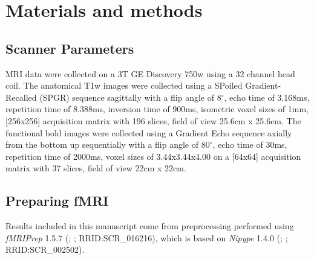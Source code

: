 \documentclass[10pt,letterpaper]{article}
\begin{document}
\section*{Materials and methods}
\subsection{Scanner Parameters}
MRI data were collected on a 3T GE Discovery 750w using a 32 channel head coil.
The anatomical T1w images were collected using a SPoiled Gradient-Recalled (SPGR) sequence
sagittally with a flip angle of 8$^{\circ}$, echo time of 3.168ms,
repetition time of 8.388ms, inversion time of 900ms, isometric voxel sizes of 1mm,
[256x256] acquisition matrix with 196 slices, field of view 25.6cm x 25.6cm.
The functional bold images were collected using a Gradient Echo sequence axially from
the bottom up sequentially with a flip angle of 80$^{\circ}$, echo time of 30ms,
repetition time of 2000ms, voxel sizes of 3.44x3.44x4.00 on a [64x64] acquisition matrix
with 37 slices, field of view 22cm x 22cm.

\subsection{Preparing fMRI}
Results included in this manuscript come from preprocessing performed
using \emph{fMRIPrep} 1.5.7 (\cite{fmriprep1}; \cite{fmriprep2}; RRID:SCR\_016216),
which is based on \emph{Nipype} 1.4.0
(\cite{nipype1}; \cite{nipype2}; RRID:SCR\_002502).
\end{document}
